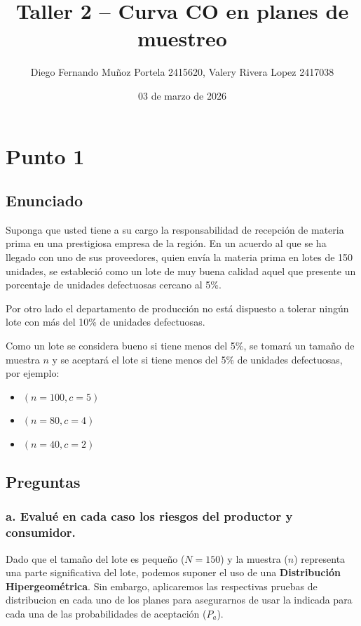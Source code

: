 \documentclass[
  12pt,
]{article}
\title{Taller 2 -- Curva CO en planes de muestreo}
\author{Diego Fernando Muñoz Portela 2415620, Valery Rivera Lopez
2417038}
\date{03 de marzo de 2026}
\providecommand{\tightlist}{%
  \setlength{\itemsep}{0pt}\setlength{\parskip}{0pt}}
\begin{document}
\maketitle

{
\setcounter{tocdepth}{3}
\tableofcontents
}
\section{Punto 1}\label{punto-1}

\subsection{Enunciado}\label{enunciado}

Suponga que usted tiene a su cargo la responsabilidad de recepción de
materia prima en una prestigiosa empresa de la región. En un acuerdo al
que se ha llegado con uno de sus proveedores, quien envía la materia
prima en lotes de 150 unidades, se estableció como un lote de muy buena
calidad aquel que presente un porcentaje de unidades defectuosas cercano
al 5\%.

Por otro lado el departamento de producción no está dispuesto a tolerar
ningún lote con más del 10\% de unidades defectuosas.

Como un lote se considera bueno si tiene menos del 5\%, se tomará un
tamaño de muestra \(n\) y se aceptará el lote si tiene menos del 5\% de
unidades defectuosas, por ejemplo:

\begin{itemize}
\tightlist
\item
  \((n=100, c=5)\)\\
\item
  \((n=80, c=4)\)\\
\item
  \((n=40, c=2)\)
\end{itemize}

\subsection{Preguntas}\label{preguntas}

\subsubsection{a. Evalué en cada caso los riesgos del productor y
consumidor.}\label{a.-evaluuxe9-en-cada-caso-los-riesgos-del-productor-y-consumidor.}

Dado que el tamaño del lote es pequeño (\(N=150\)) y la muestra (\(n\))
representa una parte significativa del lote, podemos suponer el uso de
una \textbf{Distribución Hipergeométrica}. Sin embargo, aplicaremos las
respectivas pruebas de distribucion en cada uno de los planes para
asegurarnos de usar la indicada para cada una de las probabilidades de
aceptación (\(P_a\)).
\end{document}
